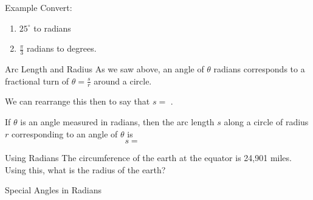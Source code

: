 \documentclass[presentation]{beamer}
\begin{document}
\begin{frame}[label={sec:org9b3dd4f}]{Example}
Convert:
\begin{enumerate}
\item \(25^{\circ}\) to radians
\item \(\frac{\pi}{3}\) radians to degrees.
\end{enumerate}

\vspace{10in}
\end{frame}

\begin{frame}[label={sec:orgb9264c4}]{Arc Length and Radius}
As we saw above, an angle of \(\theta\) radians corresponds to a
fractional turn of \(\theta = \frac{s}{r}\) around a circle.

We can rearrange this then to say that \(s =\) \uline{\hspace*{1in}}.

\begin{theorem}
If \(\theta\) is an angle measured in radians, then the arc length
\(s\) along a circle of radius \(r\) corresponding to an angle of
\(\theta\) is
\[s = \hspace{1in}\]
\end{theorem}
\end{frame}

\begin{frame}[label={sec:org40f9dde}]{Using Radians}
The circumference of the earth at the equator is 24,901 miles.  Using
this, what is the radius of the earth?

\vspace{10in}
\end{frame}

\begin{frame}[label={sec:org6fc332a}]{Special Angles in Radians}
\end{frame}
\end{document}
